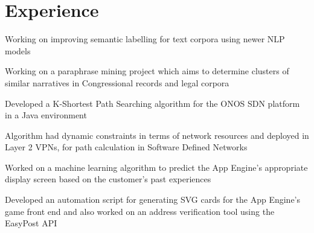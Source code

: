 \documentclass[]{onepage}
\begin{document}
\begin{minipage}[t]{0.66\textwidth}



\section{Experience}
\vspace{0.4cm}
\begin{tightemize}
\item Working on improving semantic labelling for text corpora using newer NLP models
\item Working on a paraphrase mining project which aims to determine clusters of similar narratives in Congressional records and legal corpora
\end{tightemize}
\vspace{0.1cm}

\vspace{0.07cm} %
\begin{tightemize}
\item Developed a K-Shortest Path Searching algorithm for the ONOS SDN platform in a Java environment
\item Algorithm had dynamic constraints in terms of network resources  and deployed in Layer 2 VPNs, for path calculation in Software Defined Networks
\end{tightemize}
\vspace{0.1cm}

\vspace{0.03cm}
\begin{tightemize}
\item Worked on a machine learning algorithm to predict the App Engine's appropriate display screen based on the customer's past experiences
\item Developed an automation script for generating SVG cards for the App Engine's game front end and also worked on an address verification tool using the EasyPost API
\end{tightemize}
\vspace{0.01cm}


\end{minipage}
\end{document}
